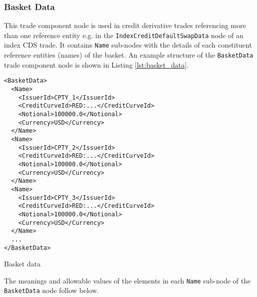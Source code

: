 \subsubsection{Basket Data}
\label{ss:basket_data} 
This trade component node is used in credit derivative trades referencing more than one reference entity e.g. in the \lstinline!IndexCreditDefaultSwapData! node of an index CDS trade. It contains \lstinline!Name! sub-nodes with the details of each constituent reference entities (names) of the basket.  An example structure of the \lstinline!BasketData! trade component node is shown in Listing \ref{lst:basket_data}.

\begin{listing}[H]
\begin{verbatim}
<BasketData>
  <Name>
    <IssuerId>CPTY_1</IssuerId>
    <CreditCurveId>RED:...</CreditCurveId>
    <Notional>100000.0</Notional>
    <Currency>USD</Currency>
  </Name>
  <Name>
    <IssuerId>CPTY_2</IssuerId>
    <CreditCurveId>RED:...</CreditCurveId>
    <Notional>100000.0</Notional>
    <Currency>USD</Currency>
  </Name>
  <Name>
    <IssuerId>CPTY_3</IssuerId>
    <CreditCurveId>RED:...</CreditCurveId>
    <Notional>100000.0</Notional>
    <Currency>USD</Currency>
  </Name>
  ...
</BasketData>
\end{verbatim}
\caption{Basket data}
\label{lst:basket_data}
\end{listing}

The meanings and allowable values of the elements in each \lstinline!Name! sub-node of the \lstinline!BasketData! node follow below. 

